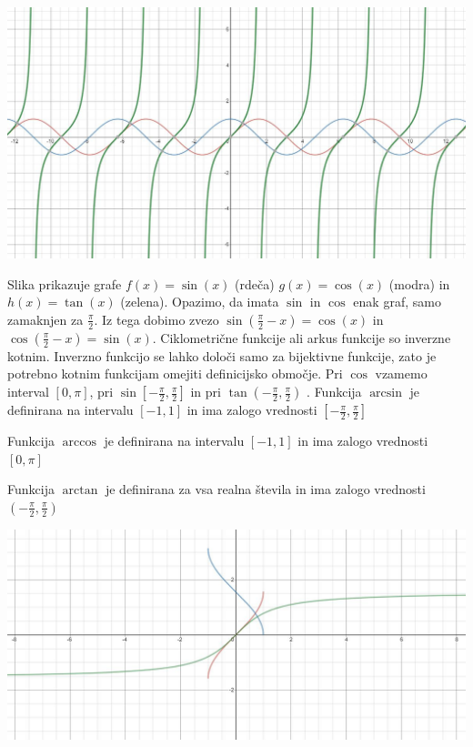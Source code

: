 \documentclass[12pt]{report}
\begin{document}
\begin{slika}[H]
  \centering
  \includegraphics[width = \textwidth]{20}
\end{slika}
 
Slika prikazuje grafe $f(x)=\sin(x)$ (rdeča) $g(x)=\cos(x)$ (modra) in $h(x)=\tan(x)$ (zelena). Opazimo, da imata $\sin$ in $\cos$ enak graf, samo zamaknjen za $\frac{\pi}{2}$. Iz tega dobimo zvezo $\sin(\frac{\pi}{2}-x)=\cos(x)$ in $\cos(\frac{\pi}{2}-x)=\sin(x)$.
\bigbreak
Ciklometrične funkcije ali arkus funkcije so inverzne kotnim. Inverzno funkcijo se lahko določi samo za bijektivne funkcije, zato je potrebno kotnim funkcijam omejiti definicijsko območje. Pri $\cos$ vzamemo interval $[0, \pi]$, pri $\sin [-\frac{\pi}{2}, \frac{\pi}{2}]$ in pri $\tan  (-\frac{\pi}{2}, \frac{\pi}{2})$ .
\bigbreak
Funkcija $\arcsin$ je definirana na intervalu $[-1, 1]$ in ima zalogo vrednosti $[-\frac{\pi}{2}, \frac{\pi}{2}]$

Funkcija $\arccos$ je definirana na intervalu $[-1, 1]$ in ima zalogo vrednosti $[0, \pi]$

Funkcija $\arctan$ je definirana za vsa realna števila in ima zalogo vrednosti $(-\frac{\pi}{2}, \frac{\pi}{2})$
		
\begin{slika}[H]
  \centering
  \includegraphics[width = \textwidth]{21}
\end{slika}
\end{document}
